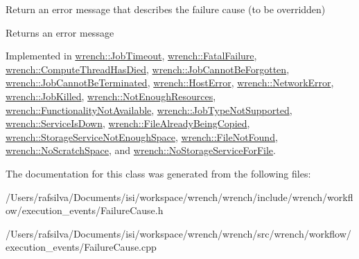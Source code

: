 Return an error message that describes the failure cause (to be overridden) 

\begin{DoxyReturn}{Returns}
an error message 
\end{DoxyReturn}


Implemented in \hyperlink{classwrench_1_1_job_timeout_a91515ca59f71777de74a4b0b169d12e7}{wrench\+::\+Job\+Timeout}, \hyperlink{classwrench_1_1_fatal_failure_a4b547da3bac56b7b23aeba34c2dbbd39}{wrench\+::\+Fatal\+Failure}, \hyperlink{classwrench_1_1_compute_thread_has_died_a4725416d9ff31b39ec9d48d23d1c1c0b}{wrench\+::\+Compute\+Thread\+Has\+Died}, \hyperlink{classwrench_1_1_job_cannot_be_forgotten_abbfbece144c738c9948bf8f01d6bbd53}{wrench\+::\+Job\+Cannot\+Be\+Forgotten}, \hyperlink{classwrench_1_1_job_cannot_be_terminated_acfa2b83db93bb68e0e773cc8b4a45505}{wrench\+::\+Job\+Cannot\+Be\+Terminated}, \hyperlink{classwrench_1_1_host_error_adacb96198ee8477b67fcac9ff8638266}{wrench\+::\+Host\+Error}, \hyperlink{classwrench_1_1_network_error_a114346c3faa84b3925600e9a22314a37}{wrench\+::\+Network\+Error}, \hyperlink{classwrench_1_1_job_killed_aa9c6b749d16db4a313ffdd83629f1c76}{wrench\+::\+Job\+Killed}, \hyperlink{classwrench_1_1_not_enough_resources_aeccad36aeccb259ac4c2d17752963269}{wrench\+::\+Not\+Enough\+Resources}, \hyperlink{classwrench_1_1_functionality_not_available_af19ea11f7e3d50d0bea7c8a66b7b1221}{wrench\+::\+Functionality\+Not\+Available}, \hyperlink{classwrench_1_1_job_type_not_supported_ab6a302367f2db332484da0c256e3ae5c}{wrench\+::\+Job\+Type\+Not\+Supported}, \hyperlink{classwrench_1_1_service_is_down_a29dbb2d3dd1b5d6a47536bab974b7151}{wrench\+::\+Service\+Is\+Down}, \hyperlink{classwrench_1_1_file_already_being_copied_a44fa6078be3bd9e0b06cd536b691666c}{wrench\+::\+File\+Already\+Being\+Copied}, \hyperlink{classwrench_1_1_storage_service_not_enough_space_a42680e32c21db44888e173d6a0358326}{wrench\+::\+Storage\+Service\+Not\+Enough\+Space}, \hyperlink{classwrench_1_1_file_not_found_ac9c3bdcc58b4626a0f3de0b4288bf4b4}{wrench\+::\+File\+Not\+Found}, \hyperlink{classwrench_1_1_no_scratch_space_add628f91104786a99a410ec07abac54c}{wrench\+::\+No\+Scratch\+Space}, and \hyperlink{classwrench_1_1_no_storage_service_for_file_ab3941ca284f35abd00e9292e22d7d553}{wrench\+::\+No\+Storage\+Service\+For\+File}.



The documentation for this class was generated from the following files\+:\begin{DoxyCompactItemize}
\item 
/\+Users/rafsilva/\+Documents/isi/workspace/wrench/wrench/include/wrench/workflow/execution\+\_\+events/Failure\+Cause.\+h\item 
/\+Users/rafsilva/\+Documents/isi/workspace/wrench/wrench/src/wrench/workflow/execution\+\_\+events/Failure\+Cause.\+cpp\end{DoxyCompactItemize}
